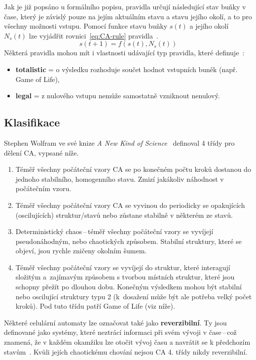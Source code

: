 Jak je již popsáno u formálního popisu, pravidla určují následující stav buňky v čase, který je závislý pouze na jejím aktuálním stavu a stavu jejího okolí, a to pro všechny možnosti vstupu. Pomocí funkce stavu buňky ${s(t)}$ a jejího okolí ${N_s(t)}$ lze vyjádřit rovnici~\ref{eq:CA-rule} pravidla~\cite{ims}.
\begin{equation}
s(t + 1) = f(s(t), N_s(t))
\label{eq:CA-rule}
\end{equation}
Některá pravidla mohou mít i vlastnosti udávající typ pravidla, které definuje~\cite{mechanics-CA}:
\begin{itemize}
    \item \textbf{totalistic} = o výsledku rozhoduje součet hodnot vstupních buněk (např. Game of Life),
    \item \textbf{legal} = z nulového vstupu nemůže samostatně vzniknout nenulový.
\end{itemize}

\subsection*{Klasifikace}
Stephen Wolfram ve své knize \textit{A New Kind of Science}~\cite{wolfram-NewKindOfScience} definoval 4 třídy pro dělení CA, vypsané níže.
\begin{enumerate}
    \item Téměř všechny počáteční vzory CA se po konečném počtu kroků dostanou do jednoho stabilního, homogenního stavu. Zmizí jakákoliv náhodnost v počátečním vzoru.
    \item Téměř všechny počáteční vzory CA se vyvinou do periodicky se opakujících (oscilujících) struktur/stavů nebo zůstane stabilně v některém ze stavů.
    \item Deterministický chaos\,--\,téměř všechny počáteční vzory se vyvíjejí pseudonáhodným, nebo chaotických způsobem. Stabilní struktury, které se objeví, jsou rychle zničeny okolním šumem.
    \item Téměř všechny počáteční vzory se vyvíjejí do struktur, které interagují složitým a~zajímavým způsobem s tvorbou místních struktur, které jsou schopny přežít po dlouhou dobu. Konečným výsledkem mohou být stabilní nebo oscilující struktury typu 2 (k~dosažení může být ale potřeba velký počet kroků). Pod tuto třídu patří Game of Life (viz níže).
\end{enumerate}

Některé celulární automaty lze označovat také jako \textbf{reverzibilní}. Ty jsou definované jako systémy, které neztrácí informaci při svém vývoji v čase\,--\,což znamená, že v každém okamžiku lze otočit vývoj času a navrátit se k předchozím stavům~\cite{ims}. Kvůli jejích chaotickému chování nejsou CA 4. třídy nikdy reverzibilní.

